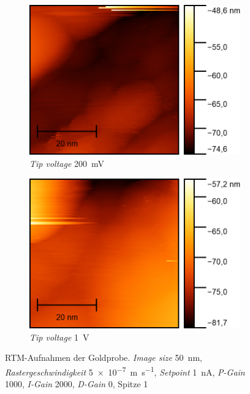 \begin{figure}[H]
    \centering
    \begin{subfigure}{0.45\textwidth}
        \centering
        \includegraphics[width=\linewidth]{../figs/Gold10476}
        \caption{\textit{Tip voltage} \SI{200}{\milli \volt}}
    \end{subfigure}
    \begin{subfigure}{0.45\textwidth}
        \centering
        \includegraphics[width=\linewidth]{../figs/Gold10479}
        \caption{\textit{Tip voltage} \SI{1}{\volt}}
    \end{subfigure}
    \caption{RTM-Aufnahmen der Goldprobe. \textit{Image size} \SI{50}{\nano \meter}, \textit{Rastergeschwindigkeit} \SI{5e-7}{\meter \per \second}, \textit{Setpoint} \SI{1}{\nano \ampere},
    \textit{P-Gain} \num{1000}, \textit{I-Gain} \num{2000}, \textit{D-Gain} \num{0}, Spitze 1}\label{fig:gold4}
\end{figure}